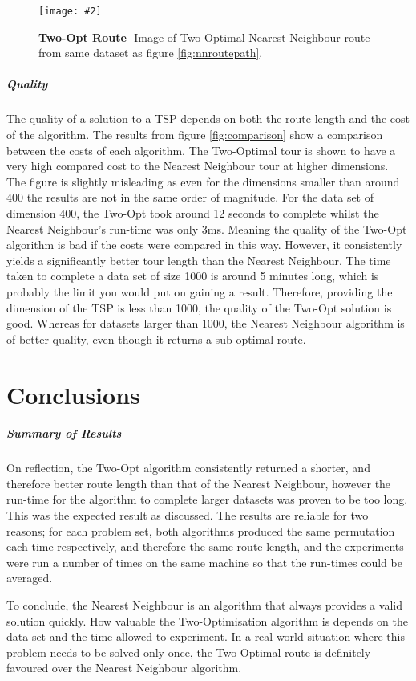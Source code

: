 \documentclass[10pt, a4paper]{article}
\newcommand{\figuremacro}[5]{
    \begin{figure}[#1]
        \centering
        \texttt{[image: \#2]}
        \caption[#3]{\textbf{#3}#4}
        \label{fig:#2}
    \end{figure}
}
\begin{document}
	\figuremacro{H}{twooptpath}{Two-Opt Route}{- Image of Two-Optimal Nearest Neighbour route from same dataset as figure \ref{fig:nnroutepath}.}{1.0}
		

	\subparagraph{Quality}
	
	The quality of a solution to a TSP depends on both the route length and the cost of the algorithm. The results from figure \ref{fig:comparison} show a comparison between the costs of each algorithm. The Two-Optimal tour is shown to have a very high compared cost to the Nearest Neighbour tour at higher dimensions. The figure is slightly misleading as even for the dimensions smaller than around 400 the results are not in the same order of magnitude. For the data set of dimension 400, the Two-Opt took around 12 seconds to complete whilst the Nearest Neighbour's run-time was only 3ms. Meaning the quality of the Two-Opt algorithm is bad if the costs were compared in this way. However, it consistently yields a significantly better tour length than the Nearest Neighbour. 
	The time taken to complete a data set of size 1000 is around 5 minutes long, which is probably the limit you would put on gaining a result. Therefore, providing the dimension of the TSP is less than 1000, the quality of the Two-Opt solution is good. Whereas for datasets larger than 1000, the Nearest Neighbour algorithm is of better quality, even though it returns a sub-optimal route.
	
	\section{Conclusions}
	
	\subparagraph{Summary of Results}
	
	On reflection, the Two-Opt algorithm consistently returned a shorter, and therefore better route length than that of the Nearest Neighbour, however the run-time for the algorithm to complete larger datasets was proven to be too long. This was the expected result as discussed. The results are reliable for two reasons; for each problem set, both algorithms produced the same permutation each time respectively, and therefore the same route length, and the experiments were run a number of times on the same machine so that the run-times could be averaged.
	
	To conclude, the Nearest Neighbour is an algorithm that always provides a valid solution quickly. How valuable the Two-Optimisation algorithm is depends on the data set and the time allowed to experiment. In a real world situation where this problem needs to be solved only once, the Two-Optimal route is definitely favoured over the Nearest Neighbour algorithm.
	
\end{document}
